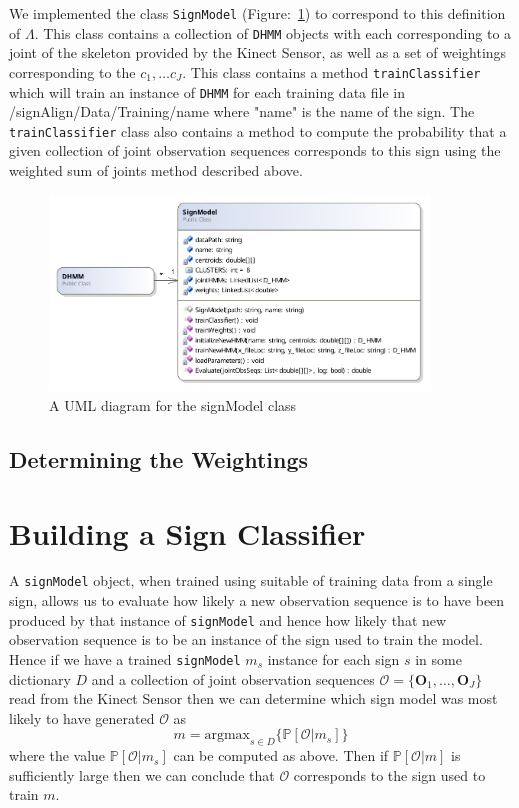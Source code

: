 We implemented the class \verb|SignModel| (Figure:~\ref{fig:signModel}) to correspond to this definition of $\Lambda$. This class contains a collection of \verb|DHMM| objects with each corresponding to a joint of the skeleton provided by the Kinect Sensor, as well as a set of weightings corresponding to the $c_1, \dots c_J$. This class contains a method \verb|trainClassifier| which will train an instance of \verb|DHMM| for each training data file in /signAlign/Data/Training/name where "name" is the name of the sign. The \verb|trainClassifier| class also contains a method to compute the probability that a given collection of joint observation sequences corresponds to this sign using the weighted sum of joints method described above.
\begin{figure}
        \centering
        \includegraphics[width=0.9\textwidth]{ThesisFigs/signModelDiag}
        \caption{A UML diagram for the signModel class}\label{fig:signModel}
\end{figure}

\subsection{Determining the Weightings}


\section{Building a Sign Classifier}
A \verb|signModel| object, when trained using suitable of training data from a single sign, allows us to evaluate how likely a new observation sequence is to have been produced by that instance of \verb|signModel| and hence how likely that new observation sequence is to be an instance of the sign used to train the model. Hence if we have a trained \verb|signModel| $m_s$ instance for each sign $s$ in some dictionary $D$ and a collection of joint observation sequences $\mathcal{O} = \{\mathbf{O}_1, \dots, \mathbf{O}_J\}$ read from the Kinect Sensor then we can determine which sign model was most likely to have generated $\mathcal{O}$ as
\begin{equation*}
m = \text{argmax}_{s \in D}\{ \mathbb{P}[\mathcal{O}|m_s]  \}
\end{equation*}
where the value $\mathbb{P}[\mathcal{O}|m_s]$ can be computed as above. Then if $\mathbb{P}[\mathcal{O}|m]$ is sufficiently large then we can conclude that $\mathcal{O}$ corresponds to the sign used to train $m$.

